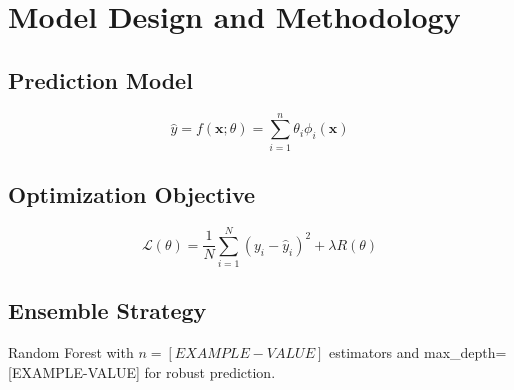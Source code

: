 \section{Model Design and Methodology}

\subsection{Prediction Model}

\[
  \hat{y} = f(\mathbf{x}; \theta) = \sum_{i=1}^{n} \theta_i \phi_i(\mathbf{x})
\]

\subsection{Optimization Objective}

\[
  \mathcal{L}(\theta) = \frac{1}{N} \sum_{i=1}^{N} (y_i - \hat{y}_i)^2 + \lambda R(\theta)
\]

\subsection{Ensemble Strategy}

Random Forest with $n = [EXAMPLE-VALUE]$ estimators and max\_depth=[EXAMPLE-VALUE] for robust prediction.
